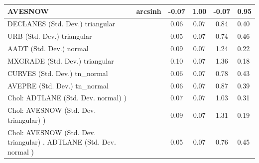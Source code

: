 \begin{table}
\begin{center}
\begin{tabular}{|l|l|c|c|c|l|}
			AVESNOW & arcsinh & -0.07 & 1.00 & -0.07 & 0.95 \\
			\hline
			DECLANES (Std. Dev.) triangular &  & 0.06 & 0.07 & 0.84 & 0.40 \\
			\hline
			URB (Std. Dev.) triangular &  & 0.05 & 0.07 & 0.74 & 0.46 \\
			\hline
			AADT (Std. Dev.) normal &  & 0.09 & 0.07 & 1.24 & 0.22 \\
			\hline
			MXGRADE (Std. Dev.) triangular &  & 0.10 & 0.07 & 1.36 & 0.18 \\
			\hline
			CURVES (Std. Dev.) tn_normal &  & 0.06 & 0.07 & 0.78 & 0.43 \\
			\hline
			AVEPRE (Std. Dev.) tn_normal &  & 0.06 & 0.07 & 0.87 & 0.39 \\
			\hline
			 Chol: ADTLANE (Std. Dev. normal) ) &  & 0.07 & 0.07 & 1.03 & 0.31 \\
			\hline
			 Chol: AVESNOW (Std. Dev. triangular) ) &  & 0.09 & 0.07 & 1.31 & 0.19 \\
			\hline
			 Chol: AVESNOW (Std. Dev. triangular) . ADTLANE (Std. Dev.   normal ) &  & 0.05 & 0.07 & 0.76 & 0.45 \\
			\hline
		\end{tabular}
	\end{center}
\end{table}